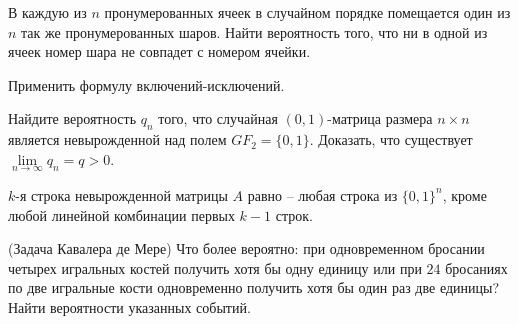 \begin{problem}
В каждую из $n$ пронумерованных ячеек в случайном порядке помещается один из $n$ так же пронумерованных шаров. 
Найти вероятность того, что ни в одной из ячеек номер шара не совпадет с номером ячейки. 

\begin{ordre}
Применить формулу включений-исключений.
\end{ordre}
\end{problem}

\begin{problem} 
Найдите вероятность $q_n$ того, что случайная $(0,1)$-матрица размера $n\times n$ является невырожденной над полем 
$GF_2=\{ 0,1\}$. Доказать, что существует $\lim\limits_{n\to\infty} q_n=q>0$. 
\end{problem}

\begin{ordre}
$k$-я строка невырожденной матрицы $A$ равно -- любая строка из $\{ 0,1\}^n$, 
кроме любой линейной комбинации первых $k-1$ строк. 
\end{ordre}

\begin{comment}
\begin{problem}
В самолете $n$ мест. Есть $n$ пассажиров, выстроившихся друг за другом в очередь. Во главе очереди -- <<заяц>>. У всех, 
кроме <<зайца>>, есть билет, на котором указан номер посадочного места. Так как <<заяц>> входит первым, он случайным образом занимает 
некоторое место. Каждый следующий пассажир, входящий в салон самолета, действует по такому принципу: если его место свободно, то 
садится на него, если занято, то занимает с равной вероятностью любое свободное. Найдите вероятность того, что последний пассажир 
сядет на свое место. 
\end{problem}
\end{comment}

\begin{problem}
(Задача Кавалера де Мере) 
Что более вероятно: при одновременном бросании четырех игральных костей получить хотя бы одну единицу или при $24$ бросаниях 
по две игральные кости одновременно получить хотя бы один раз две единицы? Найти вероятности указанных событий. 
\end{problem}

